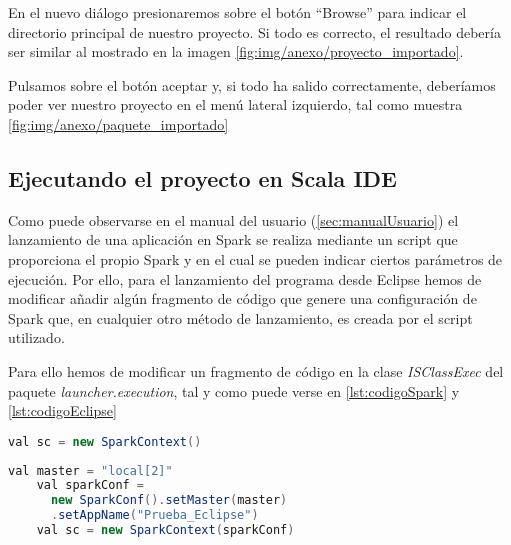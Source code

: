 
En el nuevo diálogo presionaremos sobre el botón ``Browse'' para indicar el directorio principal de nuestro proyecto. Si todo es correcto, el resultado debería ser similar al mostrado en la imagen \ref{fig:img/anexo/proyecto_importado}.


Pulsamos sobre el botón aceptar y, si todo ha salido correctamente, deberíamos poder ver nuestro proyecto en el menú lateral izquierdo, tal como muestra \ref{fig:img/anexo/paquete_importado}



\subsection{Ejecutando el proyecto en Scala IDE}

Como puede observarse en el manual del usuario (\ref{sec:manualUsuario}) el lanzamiento de una aplicación en Spark se realiza mediante un script que proporciona el propio Spark y en el cual se pueden indicar ciertos parámetros de ejecución. Por ello, para el lanzamiento del programa desde Eclipse hemos de modificar añadir algún fragmento de código que genere una configuración de Spark que, en cualquier otro método de lanzamiento, es creada por el script utilizado.

Para ello hemos de modificar un fragmento de código en la clase \textit{ISClassExec} del paquete \textit{launcher.execution}, tal y como puede verse en \ref{lst:codigoSpark} y \ref{lst:codigoEclipse}


\begin{lstlisting}[language=Java,tabsize=4,frame = single,caption=Código para la ejecución del programa mediante el script ``spark-sumbit''. ,captionpos=b,label=lst:codigoSpark]
val sc = new SparkContext()
\end{lstlisting}

\begin{lstlisting}[language=Java,tabsize=4,frame = single,caption=Ejemplo de código para la ejecución del programa desde Eclipse. ,captionpos=b,label=lst:codigoEclipse]
	val master = "local[2]"
    val sparkConf =
  	  new SparkConf().setMaster(master)
  	  .setAppName("Prueba_Eclipse")
    val sc = new SparkContext(sparkConf)
\end{lstlisting}

